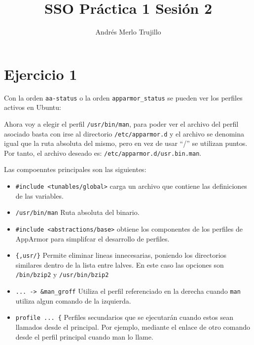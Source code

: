 \documentclass{article}
\title{SSO Práctica 1 Sesión 2}
\author{Andrés Merlo Trujillo}
\date{}
\begin{document}
\maketitle

\tableofcontents

\newpage

\section*{Ejercicio 1}
Con la orden \verb|aa-status| o la orden \verb|apparmor_status| se pueden ver los perfiles activos en Ubuntu:


Ahora voy a elegir el perfil \verb|/usr/bin/man|, para poder ver el archivo del perfil asociado basta con irse al directorio \verb|/etc/apparmor.d| y el archivo se denomina igual que la ruta absoluta del mismo, pero en vez de usar ``/'' se utilizan puntos. Por tanto, el archivo deseado es: \verb|/etc/apparmor.d/usr.bin.man|.




Las compoenntes principales son las siguientes:

\begin{itemize}
    \item \verb|#include <tunables/global>| carga un archivo que contiene las definiciones de las variables.
    \item \verb|/usr/bin/man| Ruta absoluta del binario.
    \item \verb|#include <abstractions/base>| obtiene los componentes de los perfiles de AppArmor para simplifcar el desarrollo de perfiles.
    \item \verb|{,usr/}| Permite eliminar lineas innecesarias, poniendo los directorios similares dentro de la lista entre lalves. En este caso las opciones son \verb|/bin/bzip2| y \verb|/usr/bin/bzip2|
    \item \verb|... -> &man_groff| Utiliza el perfil referenciado en la derecha cuando \verb|man| utiliza algun comando de la izquierda.
    \item \verb|profile ... {| Perfiles secundarios que se ejecutarán cuando estos sean llamados desde el principal. Por ejemplo, mediante el enlace de otro comando desde el perfil principal cuando man lo llame.
\end{itemize}
\end{document}
